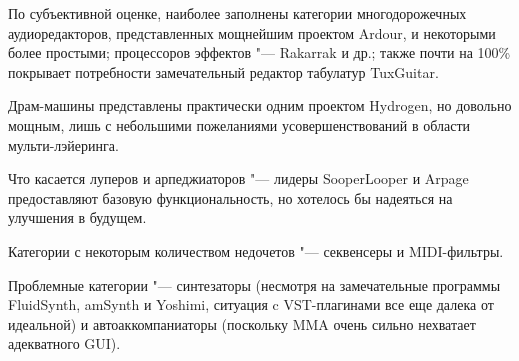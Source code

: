 \documentclass[10pt, a5paper]{article}
\begin{document}
По субъективной оценке, наиболее заполнены категории многодорожечных аудиоредакторов, представленных мощнейшим проектом Ardour, и некоторыми более простыми; процессоров эффектов "--- Rakarrak и др.; также почти на 100\% покрывает потребности замечательный редактор табулатур TuxGuitar.

Драм-машины представлены практически одним проектом Hyd\-rogen, но довольно мощным, лишь с небольшими пожеланиями усовершенствований в области мульти-лэйеринга.

Что касается луперов и арпеджиаторов "--- лидеры SooperLooper и Arpage предоставляют базовую функциональность, но хотелось бы надеяться на улучшения в будущем.

Категории с некоторым количеством недочетов "--- секвенсеры и MIDI-фильтры.

Проблемные категории "--- синтезаторы (несмотря на замечательные программы FluidSynth, amSynth и Yoshimi, ситуация  c VST-плагинами все еще далека от идеальной) и автоаккомпаниаторы (поскольку MMA очень сильно нехватает адекватного GUI).
\end{document}
